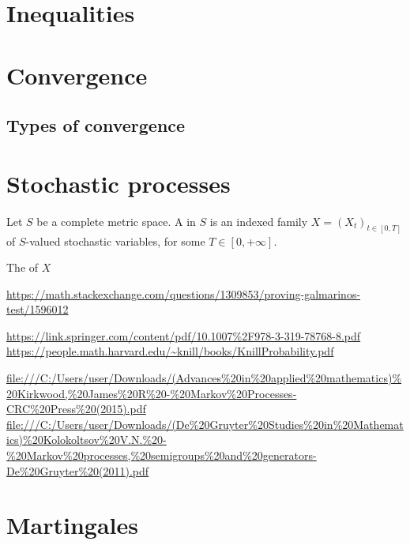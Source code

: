 \chapter{Inequalities}

\chapter{Convergence}
\section{Types of convergence}

\chapter{Stochastic processes}
\begin{definition}
Let $S$ be a complete metric space. A  in $S$ is an indexed family $X = (X_t)_{t\in[0,T]}$ of $S$-valued stochastic variables, for some $T\in [0,+\infty]$.

The  of $X$ 
\end{definition}

\url{https://math.stackexchange.com/questions/1309853/proving-galmarinos-test/1596012}

\url{https://link.springer.com/content/pdf/10.1007%2F978-3-319-78768-8.pdf}
\url{https://people.math.harvard.edu/~knill/books/KnillProbability.pdf}

\url{file:///C:/Users/user/Downloads/(Advances%20in%20applied%20mathematics)%20Kirkwood,%20James%20R%20-%20Markov%20Processes-CRC%20Press%20(2015).pdf}
\url{file:///C:/Users/user/Downloads/(De%20Gruyter%20Studies%20in%20Mathematics)%20Kolokoltsov%20V.N.%20-%20Markov%20processes,%20semigroups%20and%20generators-De%20Gruyter%20(2011).pdf}


\chapter{Martingales}